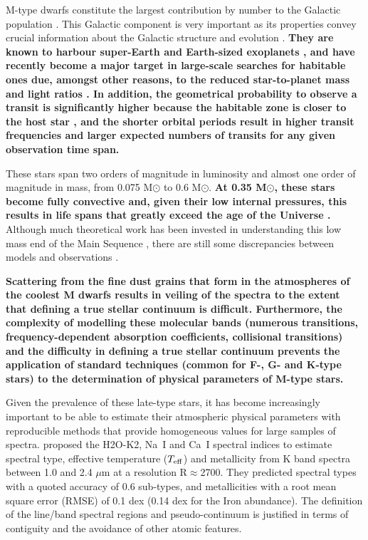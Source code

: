
M-type dwarfs constitute the largest contribution by number to the
Galactic population \citep{2010AJ....139.2679B}. This Galactic
component is very important as its properties convey crucial
information about the Galactic structure and
evolution \citep{2013A&A...556A.110B}. {\bf They are known to harbour
super-Earth \citep{2013A&A...556A.110B} and Earth-sized
exoplanets \citep{2015ApJ...807...45D}, and have recently become a
major target in large-scale searches for habitable ones due, amongst
other reasons, to the reduced star-to-planet mass and light
ratios \citep{2015A&A...577A.128A}. In addition, the geometrical
probability to observe a transit is significantly higher because the
habitable zone is closer to the host star \citep{Shields20161}, and
the shorter orbital periods result in higher transit frequencies and
larger expected numbers of transits for any given observation time
span.}

These stars span two orders of magnitude in luminosity and almost one
order of magnitude in mass, from 0.075 M$\odot$ to 0.6 M$\odot$. {\bf
At 0.35 M$\odot$, these stars become fully convective and, given their
low internal pressures, this results in life spans that greatly exceed
the age of the Universe \citep{2005AN....326..913A}.} Although much
theoretical work has been invested in understanding this low mass end
of the Main Sequence \citep{2008ApJ...676.1262B}, there are still some
discrepancies between models and observations \citep[see e.g.][for an
account of the observed inflated radii and cooler temperatures with
respect to model predictions]{2013AN....334....4T}.

{\bf Scattering from the fine dust grains that form in the atmospheres
of the coolest M dwarfs results in veiling of the
spectra \citep{2012EAS....57....3A} to the extent that defining a true
stellar continuum is difficult. Furthermore, the complexity of
modelling these molecular bands (numerous transitions,
frequency-dependent absorption coefficients, collisional transitions)
and the difficulty in defining a true stellar continuum prevents the
application of standard techniques (common for F-, G- and K-type
stars) to the determination of physical parameters of M-type stars.}

Given the prevalence of these late-type stars, it has become
increasingly important to be able to estimate their atmospheric
physical parameters with reproducible methods that provide homogeneous
values for large samples of spectra. \cite{2012ApJ...748...93R}
proposed the H2O-K2, Na~{\sc I} and Ca~{\sc I} spectral indices to
estimate spectral type, effective temperature ($T_{\rm eff}$) and
metallicity from K band spectra between 1.0 and 2.4 $\mu$m at a
resolution R$\approx$2700. They predicted spectral types with a quoted
accuracy of 0.6 sub-types, and metallicities with a root mean square
error (RMSE) of 0.1 dex (0.14 dex for the Iron abundance). The
definition of the line/band spectral regions and pseudo-continuum is
justified in terms of contiguity and the avoidance of other atomic
features. 

